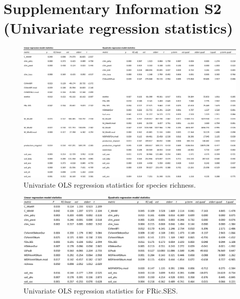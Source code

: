 \chapter[Supplementary Information S2 (Univariate regression statistics)]{Supplementary Information S2 (Univariate regression statistics)}

\begin{landscape}
\begin{figure}[h!]
\begin{center}
\includegraphics[width=20cm]{regression_stats_sprichChao1.pdf} %
\caption[Univariate OLS regression statistics for species richness.]{\small{Univariate OLS regression statistics for species richness.}} %
\label{fig:Ch4sup2_F1} %
\end{center}
\end{figure}   
\end{landscape}
\clearpage

\begin{landscape}
\begin{figure}[h!]
\begin{center}
\includegraphics[width=20cm]{S2b.pdf} %
\caption[Univariate OLS regression statistics for FRic.SES.]{\small{Univariate OLS regression statistics for FRic.SES.}} %
\label{fig:Ch4sup2_F1} %
\end{center}
\end{figure}   
\end{landscape}
\clearpage

